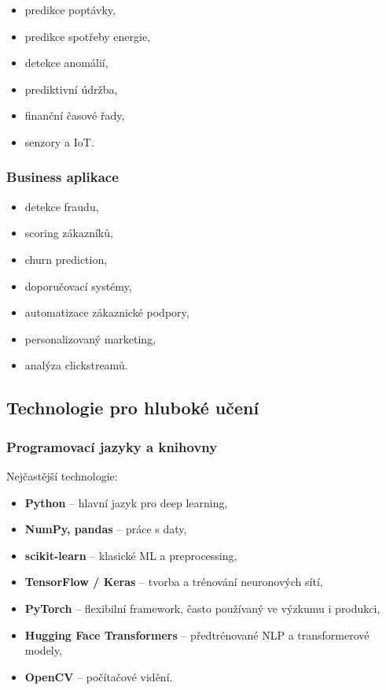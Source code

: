 \begin{itemize}
    \item predikce poptávky,
    \item predikce spotřeby energie,
    \item detekce anomálií,
    \item prediktivní údržba,
    \item finanční časové řady,
    \item senzory a IoT.
\end{itemize}

\subsubsection{Business aplikace}

\begin{itemize}
    \item detekce fraudu,
    \item scoring zákazníků,
    \item churn prediction,
    \item doporučovací systémy,
    \item automatizace zákaznické podpory,
    \item personalizovaný marketing,
    \item analýza clickstreamů.
\end{itemize}

\subsection{Technologie pro hluboké učení}

\subsubsection{Programovací jazyky a knihovny}

Nejčastější technologie:
\begin{itemize}
    \item \textbf{Python} -- hlavní jazyk pro deep learning,
    \item \textbf{NumPy, pandas} -- práce s daty,
    \item \textbf{scikit-learn} -- klasické ML a preprocessing,
    \item \textbf{TensorFlow / Keras} -- tvorba a trénování neuronových sítí,
    \item \textbf{PyTorch} -- flexibilní framework, často používaný ve výzkumu i produkci,
    \item \textbf{Hugging Face Transformers} -- předtrénované NLP a transformerové modely,
    \item \textbf{OpenCV} -- počítačové vidění.
\end{itemize}


